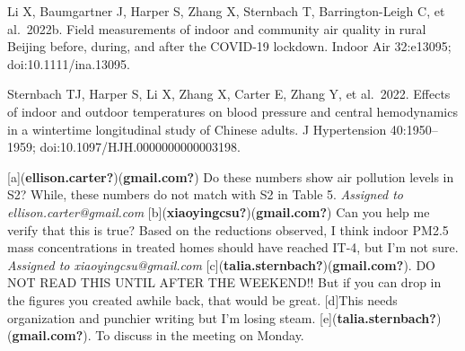 \documentclass[
  letterpaper,
  DIV=11,
  numbers=noendperiod]{scrartcl}
\begin{document}
Li X, Baumgartner J, Harper S, Zhang X, Sternbach T, Barrington-Leigh C,
et al.~2022b. Field measurements of indoor and community air quality in
rural Beijing before, during, and after the COVID-19 lockdown. Indoor
Air 32:e13095; doi:10.1111/ina.13095.

Sternbach TJ, Harper S, Li X, Zhang X, Carter E, Zhang Y, et al.~2022.
Effects of indoor and outdoor temperatures on blood pressure and central
hemodynamics in a wintertime longitudinal study of Chinese adults. J
Hypertension 40:1950--1959; doi:10.1097/HJH.0000000000003198.

{[}a{]}(\textbf{ellison.carter?})(\textbf{gmail.com?}) Do these numbers
show air pollution levels in S2? While, these numbers do not match with
S2 in Table 5. \emph{Assigned to ellison.carter@gmail.com}
{[}b{]}(\textbf{xiaoyingcsu?})(\textbf{gmail.com?}) Can you help me
verify that this is true? Based on the reductions observed, I think
indoor PM2.5 mass concentrations in treated homes should have reached
IT-4, but I'm not sure. \emph{Assigned to xiaoyingcsu@gmail.com}
{[}c{]}(\textbf{talia.sternbach?})(\textbf{gmail.com?}). DO NOT READ
THIS UNTIL AFTER THE WEEKEND!! But if you can drop in the figures you
created awhile back, that would be great. {[}d{]}This needs organization
and punchier writing but I'm losing steam.
{[}e{]}(\textbf{talia.sternbach?})(\textbf{gmail.com?}). To discuss in
the meeting on Monday.
\end{document}
